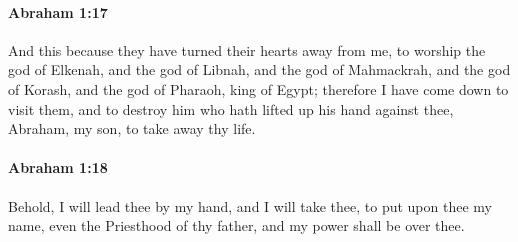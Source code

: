 		\paragraph{Abraham 1:17} %
			\label{ABRAHAM-1-17}

			And this because they have turned their hearts away from me, to worship the god of Elkenah, and the god of Libnah, and the god of Mahmackrah, and the god of Korash, and the god of Pharaoh, king of Egypt; therefore I have come down to visit them, and to destroy him who hath lifted up his hand against thee, Abraham, my son, to take away thy life.


		\paragraph{Abraham 1:18} %
			\label{ABRAHAM-1-18}

			Behold, I will lead thee by my hand, and I will take thee, to put upon thee my name, even the Priesthood of thy father, and my power shall be over thee.


